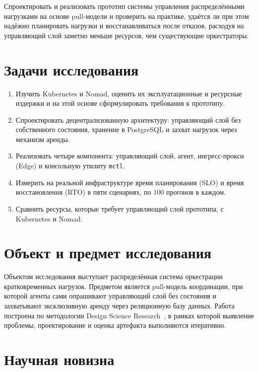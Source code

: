 \documentclass[oneside,final,14pt,a4paper]{extreport}
\begin{document}
Спроектировать и реализовать прототип системы управления распределёнными
нагрузками на основе pull-модели и проверить на практике, удаётся ли при этом
надёжно планировать нагрузки и восстанавливаться после отказов, расходуя на
управляющий слой заметно меньше ресурсов, чем существующие оркестраторы.

\section*{Задачи исследования}

\begin{enumerate}[left=0pt]
\item Изучить Kubernetes и Nomad, оценить их эксплуатационные и ресурсные
издержки и на этой основе сформулировать требования к прототипу.
\item Спроектировать децентрализованную архитектуру: управляющий слой без
собственного состояния, хранение в PostgreSQL и захват нагрузок через механизм
аренды.
\item Реализовать четыре компонента: управляющий слой, агент, ингресс-прокси
(Edge) и консольную утилиту \texttt{mctl}.
\item Измерить на реальной инфраструктуре время планирования (SLO) и время
восстановления (RTO) в пяти сценариях, по 100 прогонов в каждом.
\item Сравнить ресурсы, которые требует управляющий слой прототипа, с Kubernetes
и Nomad.
\end{enumerate}

\section*{Объект и предмет исследования}

Объектом исследования выступает распределённая система оркестрации
кратковременных нагрузок. Предметом является pull-модель координации, при которой
агенты сами опрашивают управляющий слой без состояния и захватывают эксклюзивную
аренду через реляционную базу данных. Работа построена по методологии Design
Science Research~\cite{dresch2014design}, в рамках которой выявление проблемы,
проектирование и оценка артефакта выполняются итеративно.

\section*{Научная новизна}
\end{document}
